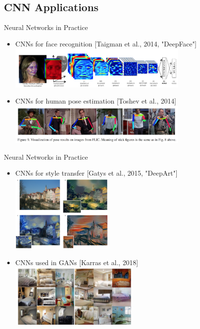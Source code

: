 \documentclass{beamer}
\begin{document}
\subsection{CNN Applications}
\begin{frame}{Neural Networks in Practice}
\begin{itemize}
\item CNNs for face recognition [Taigman et al., 2014, "DeepFace"]
\includegraphics[width=0.7\textwidth]{cnn_app1}
\item CNNs for human pose estimation [Toshev et al., 2014]\\
\includegraphics[width=0.7\textwidth]{cnn_app2}
\end{itemize}
\end{frame}


\begin{frame}{Neural Networks in Practice}
\begin{itemize}
\item CNNs for style transfer [Gatys et al., 2015, "DeepArt"]
\includegraphics[width=0.4\textwidth]{cnn_app4}
\item CNNs used in GANs [Karras et al., 2018]\\
\includegraphics[width=0.5\textwidth]{cnn_app5}
\end{itemize}
\end{frame}




\newpage


\end{document}
